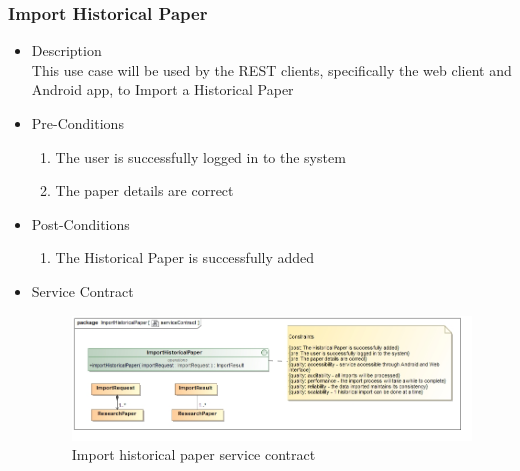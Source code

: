 \documentclass[a4paper,10pt]{article}
\begin{document}
\subsubsection{Import Historical Paper}
	\begin{itemize}
		\item Description\\
			This use case will be used by the REST clients, specifically the web client and Android app, to Import a Historical Paper
		\item Pre-Conditions
			\begin{enumerate}
				\item The user is successfully logged in to the system
				\item The paper details are correct
			\end{enumerate}
		\item Post-Conditions
			\begin{enumerate}
				\item The Historical Paper is successfully added
						
			\end{enumerate}
		\item Service Contract
		\begin{figure}[H]
			\includegraphics[scale=0.5]{ImportHistoricalPaperServiceContract}
			\caption{Import historical paper service contract}
		\end{figure}
	\end{itemize}
\end{document}
